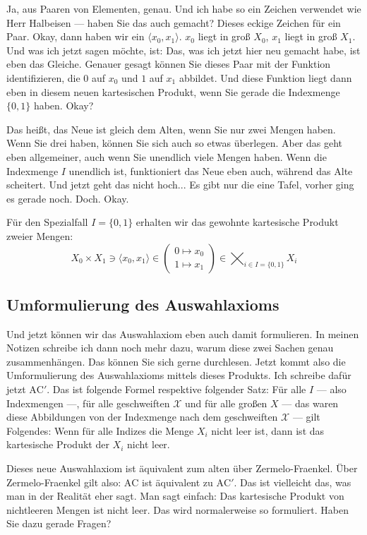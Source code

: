 \begin{spoken-clean}[continued]
Ja, aus Paaren von Elementen, genau. Und ich habe so ein Zeichen verwendet wie Herr Halbeisen --- haben Sie das auch gemacht? Dieses eckige Zeichen für ein Paar. Okay, dann haben wir ein $\langle x_0, x_1 \rangle$. $x_0$ liegt in groß $X_0$, $x_1$ liegt in groß $X_1$. Und was ich jetzt sagen möchte, ist: Das, was ich jetzt hier neu gemacht habe, ist eben das Gleiche. Genauer gesagt können Sie dieses Paar mit der Funktion identifizieren, die $0$ auf $x_0$ und $1$ auf $x_1$ abbildet. Und diese Funktion liegt dann eben in diesem neuen kartesischen Produkt, wenn Sie gerade die Indexmenge $\{0, 1\}$ haben. Okay?

Das heißt, das Neue ist gleich dem Alten, wenn Sie nur zwei Mengen haben. Wenn Sie drei haben, können Sie sich auch so etwas überlegen. Aber das geht eben allgemeiner, auch wenn Sie unendlich viele Mengen haben. Wenn die Indexmenge $I$ unendlich ist, funktioniert das Neue eben auch, während das Alte scheitert. Und jetzt geht das nicht hoch... Es gibt nur die eine Tafel, vorher ging es gerade noch. Doch. Okay.
\end{spoken-clean}

\begin{math-stroke}
Für den Spezialfall $I = \{0, 1\}$ erhalten wir das gewohnte kartesische Produkt zweier Mengen:
\[
X_0 \times X_1 \ni \langle x_0, x_1 \rangle \in \begin{pmatrix} 0 \mapsto x_0 \\ 1 \mapsto x_1 \end{pmatrix} \in \bigtimes_{i \in I=\{0,1\}} X_i
\]
\end{math-stroke}

\subsection{Umformulierung des Auswahlaxioms}

\begin{spoken-clean}[00:17:30 - 00:19:30]
Und jetzt können wir das Auswahlaxiom eben auch damit formulieren. In meinen Notizen schreibe ich dann noch mehr dazu, warum diese zwei Sachen genau zusammenhängen. Das können Sie sich gerne durchlesen. Jetzt kommt also die Umformulierung des Auswahlaxioms mittels dieses Produkts. Ich schreibe dafür jetzt $\text{AC}'$. Das ist folgende Formel respektive folgender Satz: Für alle $I$ --- also Indexmengen ---, für alle geschweiften $\mathcal{X}$ und für alle großen $X$ --- das waren diese Abbildungen von der Indexmenge nach dem geschweiften $\mathcal{X}$ --- gilt Folgendes: Wenn für alle Indizes die Menge $X_i$ nicht leer ist, dann ist das kartesische Produkt der $X_i$ nicht leer.

Dieses neue Auswahlaxiom ist äquivalent zum alten über Zermelo-Fraenkel. Über Zermelo-Fraenkel gilt also: $\text{AC}$ ist äquivalent zu $\text{AC}'$. Das ist vielleicht das, was man in der Realität eher sagt. Man sagt einfach: Das kartesische Produkt von nichtleeren Mengen ist nicht leer. Das wird normalerweise so formuliert. Haben Sie dazu gerade Fragen?
\end{spoken-clean}

